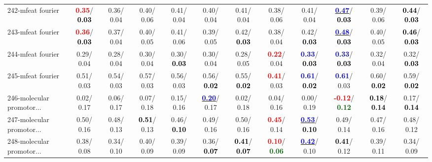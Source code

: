 \begin{table}[h]
\begin{center}
{\begin{tabular}{lc|c|c|c|c|c|c|c|c|c|c}
242-mfeat fourier & \textcolor{red}{\textbf{  0.35}}/\textcolor{black}{\textbf{  0.03}} &   0.36/  0.04 &   0.40/  0.06 &   0.41/  0.04 &   0.40/  0.04 &   0.41/  0.04 &   0.38/  0.06 &   0.41/  0.04 & \underline{\textcolor{blue}{\textbf{  0.47}}}/\textcolor{black}{\textbf{  0.03}} &   0.39/  0.06 & \textcolor{black}{\textbf{  0.44}}/\textcolor{black}{\textbf{  0.03}} \\
243-mfeat fourier & \textcolor{red}{\textbf{  0.36}}/\textcolor{black}{\textbf{  0.03}} &   0.37/  0.04 &   0.40/  0.05 &   0.41/  0.06 &   0.39/  0.05 &   0.42/\textcolor{black}{\textbf{  0.03}} &   0.38/  0.04 &   0.42/\textcolor{black}{\textbf{  0.03}} & \underline{\textcolor{blue}{\textbf{  0.48}}}/\textcolor{black}{\textbf{  0.03}} &   0.40/  0.05 & \textcolor{black}{\textbf{  0.46}}/\textcolor{black}{\textbf{  0.03}} \\
244-mfeat fourier &   0.29/  0.04 &   0.28/  0.04 &   0.30/  0.04 &   0.30/\textcolor{black}{\textbf{  0.03}} &   0.30/  0.04 &   0.28/  0.05 & \textcolor{red}{\textbf{  0.22}}/  0.04 & \textcolor{blue}{\textbf{  0.33}}/\textcolor{black}{\textbf{  0.03}} & \textcolor{blue}{\textbf{  0.33}}/\textcolor{black}{\textbf{  0.03}} &   0.32/  0.04 &   0.32/\textcolor{black}{\textbf{  0.03}} \\
245-mfeat fourier &   0.51/  0.03 &   0.54/  0.03 &   0.57/  0.03 &   0.56/  0.03 &   0.56/\textcolor{black}{\textbf{  0.02}} &   0.55/\textcolor{black}{\textbf{  0.02}} & \textcolor{red}{\textbf{  0.41}}/  0.03 & \textcolor{blue}{\textbf{  0.61}}/\textcolor{black}{\textbf{  0.02}} & \textcolor{blue}{\textbf{  0.61}}/  0.03 &   0.60/\textcolor{black}{\textbf{  0.02}} &   0.59/\textcolor{black}{\textbf{  0.02}} \\ \hline
246-molecular promotor... &   0.02/  0.17 &   0.06/  0.17 &   0.07/  0.18 &   0.15/  0.16 & \underline{\textcolor{blue}{\textbf{  0.20}}}/  0.17 &   0.02/  0.18 &   0.04/  0.16 &   0.00/  0.19 & \textcolor{red}{\textbf{ -0.12}}/\textcolor{darkgreen}{\textbf{  0.12}} & \textcolor{black}{\textbf{  0.18}}/\textcolor{black}{\textbf{  0.14}} &   0.17/\textcolor{black}{\textbf{  0.14}} \\
247-molecular promotor... &   0.50/  0.16 &   0.48/  0.13 & \textcolor{black}{\textbf{  0.51}}/  0.13 &   0.46/\textcolor{black}{\textbf{  0.10}} &   0.49/  0.16 &   0.50/  0.16 & \textcolor{red}{\textbf{  0.45}}/  0.14 & \underline{\textcolor{blue}{\textbf{  0.53}}}/\textcolor{black}{\textbf{  0.10}} &   0.49/  0.14 &   0.47/  0.16 &   0.48/  0.12 \\
248-molecular promotor... &   0.38/  0.08 &   0.34/  0.10 &   0.40/  0.09 &   0.39/  0.09 &   0.36/\textcolor{black}{\textbf{  0.07}} & \textcolor{black}{\textbf{  0.41}}/\textcolor{black}{\textbf{  0.07}} & \textcolor{red}{\textbf{  0.10}}/\textcolor{darkgreen}{\textbf{  0.06}} & \underline{\textcolor{blue}{\textbf{  0.42}}}/  0.10 & \textcolor{black}{\textbf{  0.41}}/  0.12 &   0.39/  0.11 &   0.34/  0.09 \\

\end{tabular}}
\end{center}
\end{table}
